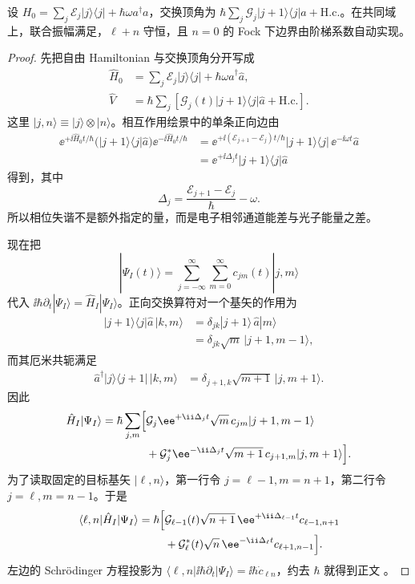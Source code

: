 \begin{proposition}[单模交换格的振幅与守恒扇区]
设 $H_0=\sum_j\mathcal E_j|j\rangle\langle j|+\hbar\omega a^\dagger a$，交换顶角为 $\hbar\sum_j\mathcal G_j|j+1\rangle\langle j|a+\mathrm{H.c.}$。在共同域上，联合振幅满足，$\ell+n$ 守恒，且 $n=0$ 的 Fock 下边界由阶梯系数自动实现。
\end{proposition}
\begin{proof}
先把自由 Hamiltonian 与交换顶角分开写成
\begin{align*}
 \hat H_0
 &=\sum_j\mathcal E_j|j\rangle\langle j|
   +\hbar\omega\hat a^\dagger\hat a,\\
 \hat V
 &=\hbar\sum_j\left[
 \mathcal G_j(t)|j+1\rangle\langle j|\hat a+\mathrm{H.c.}\right].
\end{align*}
这里 $|j,n\rangle\equiv|j\rangle\otimes|n\rangle$。相互作用绘景中的单条正向边由
\begin{align*}
 \ee^{+\ii\hat H_0t/\hbar}
 \bigl(|j+1\rangle\langle j|\hat a\bigr)
 \ee^{-\ii\hat H_0t/\hbar}
 &={}
 \ee^{+\ii(\mathcal E_{j+1}-\mathcal E_j)t/\hbar}
 |j+1\rangle\langle j|\,
 \ee^{-\ii\omega t}\hat a\\
 &=\ee^{+\ii\Delta_jt}|j+1\rangle\langle j|\hat a
\end{align*}
得到，其中
\[
 \Delta_j=\frac{\mathcal E_{j+1}-\mathcal E_j}{\hbar}-\omega.
\]
所以相位失谐不是额外指定的量，而是电子相邻通道能差与光子能量之差。

现在把
\[
 |\Psi_I(t)\rangle=\sum_{j= -\infty}^{\infty}\sum_{m=0}^{\infty}
 c_{jm}(t)|j,m\rangle
\]
代入 $\ii\hbar\partial_t|\Psi_I\rangle=\hat H_I|\Psi_I\rangle$。正向交换算符对一个基矢的作用为
\begin{align*}
 |j+1\rangle\langle j|\hat a\,|k,m\rangle
 &=\delta_{jk}|j+1\rangle\,\hat a|m\rangle\\
 &=\delta_{jk}\sqrt m\,|j+1,m-1\rangle,
\end{align*}
而其厄米共轭满足
\begin{align*}
 \hat a^\dagger|j\rangle\langle j+1|\,|k,m\rangle
 &=\delta_{j+1,k}\sqrt{m+1}\,|j,m+1\rangle.
\end{align*}
因此
\begin{align*}
 \hat H_I|\Psi_I\rangle
 =\hbar\sum_{j,m}\Bigl[&
 \mathcal G_j\ee^{+\ii\Delta_jt}\sqrt m\,c_{jm}
 |j+1,m-1\rangle\\
 &+\mathcal G_j^*\ee^{-\ii\Delta_jt}\sqrt{m+1}\,c_{j+1,m}
 |j,m+1\rangle\Bigr].
\end{align*}
为了读取固定的目标基矢 $|\ell,n\rangle$，第一行令 $j=\ell-1,m=n+1$，第二行令 $j=\ell,m=n-1$。于是
\begin{align*}
 \langle\ell,n|\hat H_I|\Psi_I\rangle
 =\hbar\Bigl[&
 \mathcal G_{\ell-1}(t)\sqrt{n+1}\,
 \ee^{+\ii\Delta_{\ell-1}t}c_{\ell-1,n+1}\\
 &+\mathcal G_\ell^*(t)\sqrt n\,
 \ee^{-\ii\Delta_\ell t}c_{\ell+1,n-1}\Bigr].
\end{align*}
左边的 Schr\"odinger 方程投影为
$\langle\ell,n|\ii\hbar\partial_t|\Psi_I\rangle
=\ii\hbar\dot c_{\ell n}$，约去 $\hbar$ 就得到正文
。


\end{proof}
